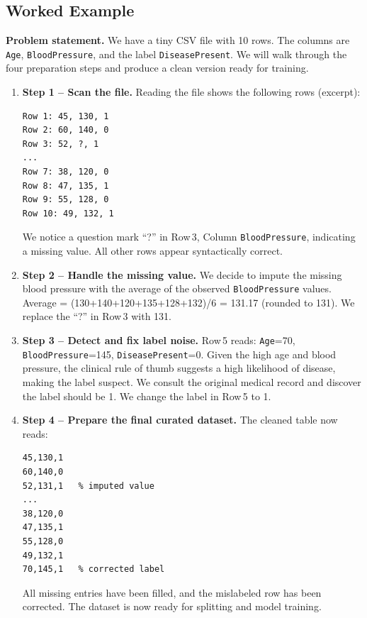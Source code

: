 \documentclass[12pt, a4paper]{article}
\begin{document}
\subsection{Worked Example}
\textbf{Problem statement.}  
We have a tiny CSV file with 10 rows. The columns are \texttt{Age}, \texttt{BloodPressure}, and the label \texttt{DiseasePresent}. We will walk through the four preparation steps and produce a clean version ready for training.

\begin{enumerate}
\item \textbf{Step 1 – Scan the file.}  
Reading the file shows the following rows (excerpt):

\begin{verbatim}
Row 1: 45, 130, 1
Row 2: 60, 140, 0
Row 3: 52, ?, 1
...
Row 7: 38, 120, 0
Row 8: 47, 135, 1
Row 9: 55, 128, 0
Row 10: 49, 132, 1
\end{verbatim}
We notice a question mark “?” in Row 3, Column \texttt{BloodPressure}, indicating a missing value. All other rows appear syntactically correct.

\item \textbf{Step 2 – Handle the missing value.}  
We decide to impute the missing blood pressure with the average of the observed \texttt{BloodPressure} values.  
Average = (130+140+120+135+128+132)/6 = 131.17 (rounded to 131).  
We replace the “?” in Row 3 with 131.

\item \textbf{Step 3 – Detect and fix label noise.}  
Row 5 reads: \texttt{Age}=70, \texttt{BloodPressure}=145, \texttt{DiseasePresent}=0.  
Given the high age and blood pressure, the clinical rule of thumb suggests a high likelihood of disease, making the label suspect.  
We consult the original medical record and discover the label should be 1.  
We change the label in Row 5 to 1.

\item \textbf{Step 4 – Prepare the final curated dataset.}  
The cleaned table now reads:

\begin{verbatim}
45,130,1
60,140,0
52,131,1   % imputed value
...
38,120,0
47,135,1
55,128,0
49,132,1
70,145,1   % corrected label
\end{verbatim}
All missing entries have been filled, and the mislabeled row has been corrected. The dataset is now ready for splitting and model training.

\end{enumerate}
\end{document}
